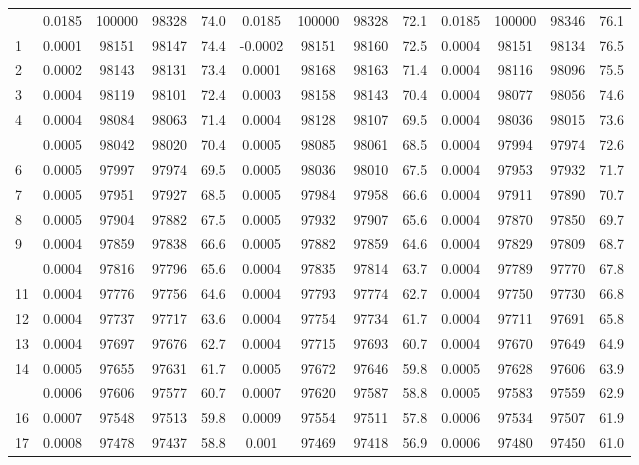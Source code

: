 \documentclass[
  14pt,
]{article}
\begin{document}
\begin{longtable}[t]{lcccccccccccc}
\endfoot
\bottomrule
\endlastfoot
0 & 0.0185 & 100000 & 98328 & 74.0 & 0.0185 & 100000 & 98328 & 72.1 & 0.0185 & 100000 & 98346 & 76.1\\
1 & 0.0001 & 98151 & 98147 & 74.4 & -0.0002 & 98151 & 98160 & 72.5 & 0.0004 & 98151 & 98134 & 76.5\\
2 & 0.0002 & 98143 & 98131 & 73.4 & 0.0001 & 98168 & 98163 & 71.4 & 0.0004 & 98116 & 98096 & 75.5\\
3 & 0.0004 & 98119 & 98101 & 72.4 & 0.0003 & 98158 & 98143 & 70.4 & 0.0004 & 98077 & 98056 & 74.6\\
4 & 0.0004 & 98084 & 98063 & 71.4 & 0.0004 & 98128 & 98107 & 69.5 & 0.0004 & 98036 & 98015 & 73.6\\
\addlinespace
5 & 0.0005 & 98042 & 98020 & 70.4 & 0.0005 & 98085 & 98061 & 68.5 & 0.0004 & 97994 & 97974 & 72.6\\
6 & 0.0005 & 97997 & 97974 & 69.5 & 0.0005 & 98036 & 98010 & 67.5 & 0.0004 & 97953 & 97932 & 71.7\\
7 & 0.0005 & 97951 & 97927 & 68.5 & 0.0005 & 97984 & 97958 & 66.6 & 0.0004 & 97911 & 97890 & 70.7\\
8 & 0.0005 & 97904 & 97882 & 67.5 & 0.0005 & 97932 & 97907 & 65.6 & 0.0004 & 97870 & 97850 & 69.7\\
9 & 0.0004 & 97859 & 97838 & 66.6 & 0.0005 & 97882 & 97859 & 64.6 & 0.0004 & 97829 & 97809 & 68.7\\
\addlinespace
10 & 0.0004 & 97816 & 97796 & 65.6 & 0.0004 & 97835 & 97814 & 63.7 & 0.0004 & 97789 & 97770 & 67.8\\
11 & 0.0004 & 97776 & 97756 & 64.6 & 0.0004 & 97793 & 97774 & 62.7 & 0.0004 & 97750 & 97730 & 66.8\\
12 & 0.0004 & 97737 & 97717 & 63.6 & 0.0004 & 97754 & 97734 & 61.7 & 0.0004 & 97711 & 97691 & 65.8\\
13 & 0.0004 & 97697 & 97676 & 62.7 & 0.0004 & 97715 & 97693 & 60.7 & 0.0004 & 97670 & 97649 & 64.9\\
14 & 0.0005 & 97655 & 97631 & 61.7 & 0.0005 & 97672 & 97646 & 59.8 & 0.0005 & 97628 & 97606 & 63.9\\
\addlinespace
15 & 0.0006 & 97606 & 97577 & 60.7 & 0.0007 & 97620 & 97587 & 58.8 & 0.0005 & 97583 & 97559 & 62.9\\
16 & 0.0007 & 97548 & 97513 & 59.8 & 0.0009 & 97554 & 97511 & 57.8 & 0.0006 & 97534 & 97507 & 61.9\\
17 & 0.0008 & 97478 & 97437 & 58.8 & 0.001 & 97469 & 97418 & 56.9 & 0.0006 & 97480 & 97450 & 61.0\\

\end{longtable}
\end{document}
